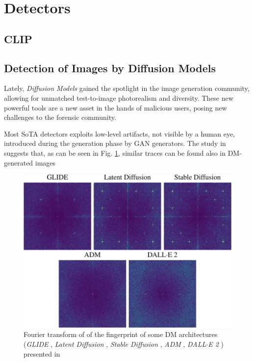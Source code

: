 \documentclass[conference]{IEEEtran} %
\begin{document}
\section{Detectors}
    \subsection{CLIP}
    \subsection{Detection of Images by Diffusion Models} 
        Lately, \textit{Diffusion Models} gained the spotlight in the image generation community, allowing for unmatched test-to-image photorealism and diversity. These new powerful tools are a new asset in the hands of malicious users, posing new challenges to the forensic community. 

        Most SoTA detectors exploits low-level artifacts, not visible by a human eye, introduced during the generation phase by GAN generators. The study in \cite{corvi2023detection} suggests that, as can be seen in Fig. \ref{fig:pizza_fourier}, similar traces can be found also in DM-generated images

        \begin{figure}[h]
            \centering
            \includegraphics[width=0.8\linewidth]{Img/pizza_fourier.png}
            \caption{Fourier transform of of the fingerprint of some DM architectures (\textit{GLIDE} \cite{nichol2021glide}, \textit{Latent Diffusion} \cite{rombach2022high}, \textit{Stable Diffusion} \cite{stablediffusion2022}, \textit{ADM} \cite{dhariwal2021diffusion}, \textit{DALL$\cdot$E 2} \cite{ramesh2022hierarchical}) presented in \cite{corvi2023detection}}
            \label{fig:pizza_fourier}
        \end{figure}
\end{document}
